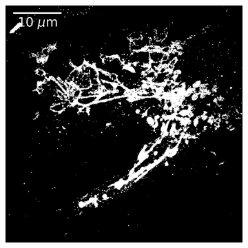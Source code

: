 \begin{figure}
    \begin{subfigure}{0.49\textwidth}
        \includegraphics[width=\textwidth]{figures/mitochondria_image9.png}
        \caption{}
    \end{subfigure}
    \begin{subfigure}{0.49\textwidth}

\end{subfigure}
\end{figure}
